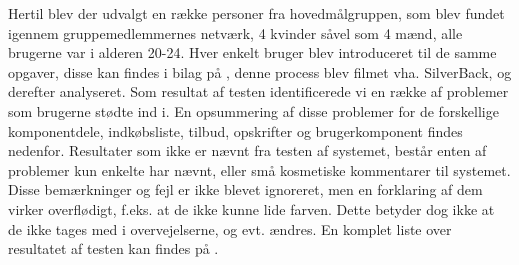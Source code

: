 Hertil blev der udvalgt en række personer fra hovedmålgruppen, som blev fundet igennem gruppemedlemmernes netværk, 4 kvinder såvel som 4 mænd, alle brugerne var i alderen 20-24.
Hver enkelt bruger blev introduceret til de samme opgaver, disse kan findes i bilag på , denne process blev filmet vha. SilverBack, og derefter analyseret.
Som resultat af testen identificerede vi en række af problemer som brugerne stødte ind i.
En opsummering af disse problemer for de forskellige komponentdele, indkøbsliste, tilbud, opskrifter og brugerkomponent findes nedenfor.
Resultater som ikke er nævnt fra testen af systemet, består enten af problemer kun enkelte har nævnt, eller små kosmetiske kommentarer til systemet.
Disse bemærkninger og fejl er ikke blevet ignoreret, men en forklaring af dem virker overflødigt, f.eks. at de ikke kunne lide farven. 
Dette betyder dog ikke at de ikke tages med i overvejelserne, og evt. ændres.
En komplet liste over resultatet af testen kan findes på .
